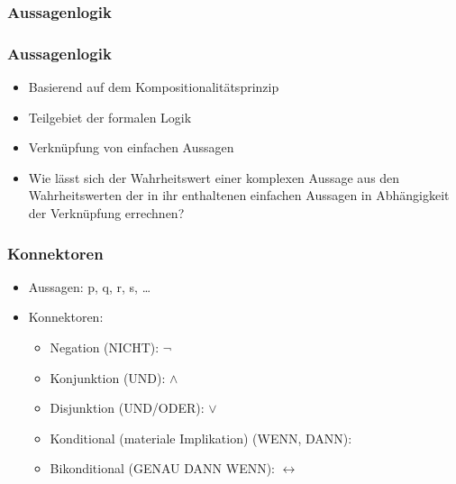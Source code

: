 %
\subsubsection{Aussagenlogik}


\begin{frame}
\frametitle{Aussagenlogik}

\begin{itemize}
	\item Basierend auf dem Kompositionalitätsprinzip
	\item Teilgebiet der formalen Logik
	\item Verknüpfung von einfachen Aussagen
	\item Wie lässt sich der Wahrheitswert einer komplexen Aussage aus den Wahrheitswerten der in ihr enthaltenen einfachen Aussagen in Abhängigkeit der Verknüpfung errechnen?
\end{itemize}

\end{frame}




\begin{frame}
\frametitle{Konnektoren}

\begin{itemize}
	\item Aussagen: p, q, r, s, \dots
	\item Konnektoren:
	
	\begin{itemize}
		\item Negation (NICHT): $\lnot$
		
		\item Konjunktion (UND): $\land$
		
		\item Disjunktion (UND/ODER): $\lor$
		
		\item Konditional (materiale Implikation) (WENN, DANN): \ras
		
		\item Bikonditional (GENAU DANN WENN): $\leftrightarrow$
	\end{itemize}
	
\end{itemize}

\end{frame}



